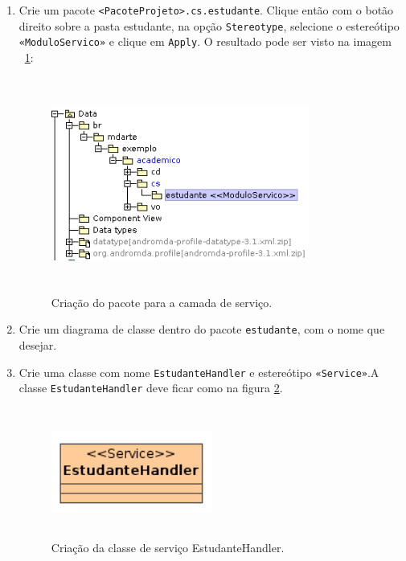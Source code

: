 \begin{enumerate}
\item Crie um pacote \texttt{<PacoteProjeto>.cs.estudante}. Clique então com o
botão direito sobre a pasta estudante, na opção \texttt{Stereotype}, selecione o
estereótipo \texttt{«ModuloServico»} e clique em \texttt{Apply}. O resultado
pode ser visto na imagem ~\ref{cria_pacote_servico}:
 \begin{figure}[H]
	\centering
	\includegraphics[width=240pt,height=200pt]{imgs/tutorial-mdarte-0008.png}
	\caption{Criação do pacote para a camada de serviço.}
	\label{cria_pacote_servico}
\end{figure} 
	
\item Crie um diagrama de classe dentro do pacote \texttt{estudante}, com o nome
que desejar.
	
\item Crie uma classe com nome \texttt{EstudanteHandler} e estereótipo
\texttt{«Service»}.A classe \texttt{EstudanteHandler} deve ficar como na figura
\ref{cria_sevico_estudante}.
\begin{figure}[H]
	\centering
	\includegraphics[width=150pt,height=120pt]{imgs/tutorial-mdarte-0009.png}
	\caption{Criação da classe de serviço EstudanteHandler.}
	\label{cria_sevico_estudante}
\end{figure} 
	

\end{enumerate}
